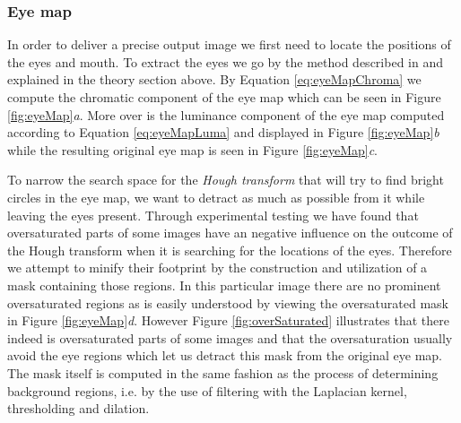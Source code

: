 \subsubsection{Eye map}

In order to deliver a precise output image we first need to locate the positions of the eyes and mouth. To extract the eyes we go by the method described in \cite{fdInColorImages} and explained in the theory section above. By Equation \ref{eq:eyeMapChroma} we compute the chromatic component of the eye map which can be seen in Figure \ref{fig:eyeMap}\textit{a}. More over is the luminance component of the eye map computed according to Equation \ref{eq:eyeMapLuma} and displayed in Figure \ref{fig:eyeMap}\textit{b} while the resulting original eye map is seen in Figure \ref{fig:eyeMap}\textit{c}.



To narrow the search space for the \textit{Hough transform} that will try to find bright circles in the eye map, we want to detract as much as possible from it while leaving the eyes present. Through experimental testing we have found that oversaturated parts of some images have an negative influence on the outcome of the Hough transform when it is searching for the locations of the eyes. Therefore we attempt to minify their footprint by the construction and utilization of a mask containing those regions. In this particular image there are no prominent oversaturated regions as is easily understood by viewing the oversaturated mask in Figure \ref{fig:eyeMap}\textit{d}. However Figure \ref{fig:overSaturated} illustrates that there indeed is oversaturated parts of some images and that the oversaturation usually avoid the eye regions which let us detract this mask from the original eye map. The mask itself is computed in the same fashion as the process of determining background regions, i.e. by the use of filtering with the Laplacian kernel, thresholding and dilation.


